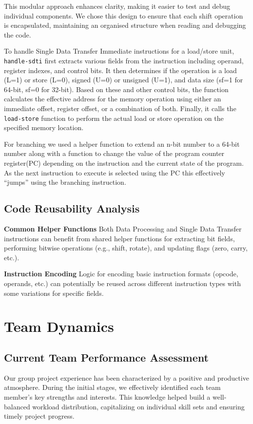 \documentclass[9pt,a4paper,twoside]{tau-class/tau}
\begin{document}
        This modular approach enhances clarity, making it easier to test and debug individual components. We chose this design to ensure that each shift operation is encapsulated, maintaining an organised structure when reading and debugging the code.
        
        To handle Single Data Transfer Immediate instructions for a load/store unit, \texttt{handle-sdti} first extracts various fields from the instruction including operand, register indexes, and control bits. It then determines if the operation is a load (L=1) or store (L=0), signed (U=0) or unsigned (U=1), and data size (sf=1 for 64-bit, sf=0 for 32-bit). Based on these and other control bits, the function calculates the effective address for the memory operation using either an immediate offset, register offset, or a combination of both. Finally, it calls the \texttt{load-store} function to perform the actual load or store operation on the specified memory location.

        For branching we used a helper function to extend an n-bit number to a 64-bit number along with a function to change the value of the program counter register(PC) depending on the instruction and the current state of the program. As the next instruction to execute is selected using the PC this effectively “jumps” using the branching instruction.

        
    \subsection{Code Reusability Analysis}
        \textbf{Common Helper Functions} 
        Both Data Processing and Single Data Transfer instructions can benefit from shared helper functions for extracting bit fields, performing bitwise operations (e.g., shift, rotate), and updating flags (zero, carry, etc.).
        
        \noindent \textbf{Instruction Encoding}
        Logic for encoding basic instruction formats (opcode, operands, etc.) can potentially be reused across different instruction types with some variations for specific fields.

\section{Team Dynamics}
    \subsection{Current Team Performance Assessment}
        Our group project experience has been characterized by a positive and productive atmosphere.  During the initial stages, we effectively identified each team member's key strengths and interests.  This knowledge helped build a well-balanced workload distribution, capitalizing on individual skill sets and ensuring timely project progress.  
        
\end{document}
